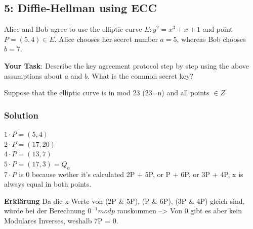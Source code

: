 \documentclass[11pt]{article}
\begin{document}
\newpage

    \hypertarget{diffie-hellman-using-ecc}{%
\subsection{5: Diffie-Hellman using ECC}\label{diffie-hellman-using-ecc}}

Alice and Bob agree to use the elliptic curve \(E : y^2 = x^3 +x+1\) and
point \(P = (5,4) \in E\). Alice chooses her secret number \(a = 5\),
whereas Bob chooses \(b = 7\).

\textbf{Your Task}: Describe the key agreement protocol step by step
using the above assumptions about \(a\) and \(b\). What is the common
secret key?

Suppose that the elliptic curve is in mod 23 (23=n) and all points
\(\in Z\)

\hypertarget{solution}{%
\subsubsection{Solution}\label{solution}}

\(1\cdot P=(5,4)\)\\
\(2\cdot P=(17,20)\)\\
\(4\cdot P=(13,7)\)\\
\(5\cdot P=(17,3)=Q_a\)\\
\(7\cdot P\) is 0 because wether it's calculated 2P + 5P, or P + 6P, or
3P + 4P, x is always equal in both points.

\textbf{Erklärung} Da die x-Werte von (2P \& 5P), (P \& 6P), (3P \& 4P)
gleich sind, würde bei der Berechnung \(0^{-1} mod p\) rauskommen
--\textgreater{} Von 0 gibt es aber kein Modulares Inverses, weshalb 7P
= 0.
\end{document}
